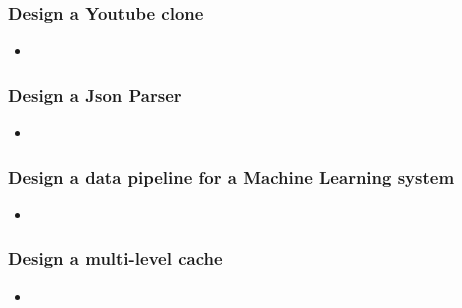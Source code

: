 \begin{frame}
	\frametitle{Design a Youtube clone}
		
			\begin{itemize}
				\item 
			\end{itemize}
\end{frame}

\begin{frame}
	\frametitle{Design a Json Parser }
		
			\begin{itemize}
				\item 
			\end{itemize}
\end{frame}

\begin{frame}
	\frametitle{Design a data pipeline for a Machine Learning system}
		
			\begin{itemize}
				\item 
			\end{itemize}
\end{frame}

\begin{frame}
	\frametitle{Design a multi-level cache }
		
			\begin{itemize}
				\item 
			\end{itemize}
\end{frame}
